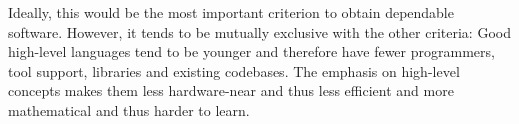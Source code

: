 Ideally, this would be the most important criterion to obtain dependable software.
However, it tends to be mutually exclusive with the other criteria:
Good high-level languages tend to be younger and therefore have fewer programmers, tool support, libraries and existing codebases.
The emphasis on high-level concepts makes them less hardware-near and thus less efficient and more mathematical and thus harder to learn.
